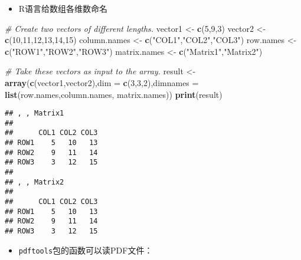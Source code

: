 \documentclass[
]{book}
\newenvironment{Shaded}{\begin{snugshade}}{\end{snugshade}}
\newcommand{\CommentTok}[1]{\textcolor[rgb]{0.56,0.35,0.01}{\textit{#1}}}
\newcommand{\DataTypeTok}[1]{\textcolor[rgb]{0.13,0.29,0.53}{#1}}
\newcommand{\DecValTok}[1]{\textcolor[rgb]{0.00,0.00,0.81}{#1}}
\newcommand{\KeywordTok}[1]{\textcolor[rgb]{0.13,0.29,0.53}{\textbf{#1}}}
\newcommand{\NormalTok}[1]{#1}
\newcommand{\StringTok}[1]{\textcolor[rgb]{0.31,0.60,0.02}{#1}}
\providecommand{\tightlist}{%
  \setlength{\itemsep}{0pt}\setlength{\parskip}{0pt}}
\begin{document}
\begin{itemize}
\tightlist
\item
  R语言给数组各维数命名
\end{itemize}

\begin{Shaded}
\begin{Highlighting}[]
\CommentTok{# Create two vectors of different lengths.}
\NormalTok{vector1 <-}\StringTok{ }\KeywordTok{c}\NormalTok{(}\DecValTok{5}\NormalTok{,}\DecValTok{9}\NormalTok{,}\DecValTok{3}\NormalTok{)}
\NormalTok{vector2 <-}\StringTok{ }\KeywordTok{c}\NormalTok{(}\DecValTok{10}\NormalTok{,}\DecValTok{11}\NormalTok{,}\DecValTok{12}\NormalTok{,}\DecValTok{13}\NormalTok{,}\DecValTok{14}\NormalTok{,}\DecValTok{15}\NormalTok{)}
\NormalTok{column.names <-}\StringTok{ }\KeywordTok{c}\NormalTok{(}\StringTok{"COL1"}\NormalTok{,}\StringTok{"COL2"}\NormalTok{,}\StringTok{"COL3"}\NormalTok{)}
\NormalTok{row.names <-}\StringTok{ }\KeywordTok{c}\NormalTok{(}\StringTok{"ROW1"}\NormalTok{,}\StringTok{"ROW2"}\NormalTok{,}\StringTok{"ROW3"}\NormalTok{)}
\NormalTok{matrix.names <-}\StringTok{ }\KeywordTok{c}\NormalTok{(}\StringTok{"Matrix1"}\NormalTok{,}\StringTok{"Matrix2"}\NormalTok{)}

\CommentTok{# Take these vectors as input to the array.}
\NormalTok{result <-}\StringTok{ }\KeywordTok{array}\NormalTok{(}\KeywordTok{c}\NormalTok{(vector1,vector2),}\DataTypeTok{dim =} \KeywordTok{c}\NormalTok{(}\DecValTok{3}\NormalTok{,}\DecValTok{3}\NormalTok{,}\DecValTok{2}\NormalTok{),}\DataTypeTok{dimnames =} \KeywordTok{list}\NormalTok{(row.names,column.names,}
\NormalTok{                                                                  matrix.names))}
\KeywordTok{print}\NormalTok{(result)}
\end{Highlighting}
\end{Shaded}

\begin{verbatim}
## , , Matrix1
## 
##      COL1 COL2 COL3
## ROW1    5   10   13
## ROW2    9   11   14
## ROW3    3   12   15
## 
## , , Matrix2
## 
##      COL1 COL2 COL3
## ROW1    5   10   13
## ROW2    9   11   14
## ROW3    3   12   15
\end{verbatim}

\begin{itemize}
\tightlist
\item
  \texttt{pdftools}包的函数可以读PDF文件：
\end{itemize}
\end{document}
